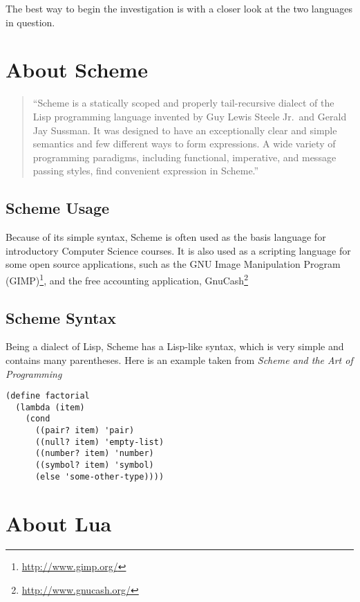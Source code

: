 \noindent The best way to begin the investigation is with a closer look at the
two languages in question.

\section{About Scheme}

\begin{quotation}
``Scheme is a statically scoped and properly tail-recursive
dialect of the Lisp programming language invented by Guy Lewis Steele Jr.\ and
Gerald Jay Sussman. It was designed to have an exceptionally clear and simple
semantics and few different ways to form expressions. A wide variety of
programming paradigms, including functional, imperative, and message passing
styles, find convenient expression in Scheme.''~\cite{r6rs}
\end{quotation}

\subsection{Scheme Usage}

Because of its simple syntax, Scheme is often used as the basis language for
introductory Computer Science courses. It is also used as a scripting language
for some open source applications, such as the GNU Image Manipulation Program
(GIMP)\footnote{\url{http://www.gimp.org/}}, and the free accounting
application, GnuCash\footnote{\url{http://www.gnucash.org/}}

\subsection{Scheme Syntax}

Being a dialect of Lisp, Scheme has a Lisp-like syntax, which is very simple and
contains many parentheses. Here is an example taken from \emph{Scheme and the
Art of Programming}~\cite[p.40]{schemebook}
\begin{framed}
\begin{verbatim}
(define factorial
  (lambda (item)
    (cond
      ((pair? item) 'pair)
      ((null? item) 'empty-list)
      ((number? item) 'number)
      ((symbol? item) 'symbol)
      (else 'some-other-type))))
\end{verbatim}
\end{framed}


\section{About Lua}

